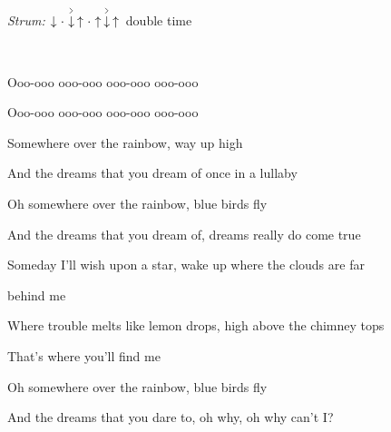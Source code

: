 \begin{song}


\begin{headerbox}
\RaiseBoxWithAccents
{} \quad
\textit{Strum:} $\Down\Miss\AccentDown\Up\Miss\Up\AccentDown\Up$ double time
\end{headerbox}

\begin{hchordbox}
\end{hchordbox}

\large

\bigskip

  \textbar\   \textbar\ 
  \textbar\   \textbar\  \par
{}Ooo-ooo \ch{Em}ooo-ooo ooo-ooo  \ch{C}ooo-ooo \par
\ch{F}Ooo-ooo ooo-ooo ooo-ooo ooo-ooo \par

\bigskip
 
Somewhere over the rainbow,  way up high \par
\ch{F}And the dreams that you dream of \ch{G}once in a lullaby  \par
Oh somewhere \ch{Em}over the rainbow, \ch{F}blue birds \ch{C}fly \par
\ch{F}And the \ch{C}dreams that you dream of, \ch{G}dreams really do come true  \par

\bigskip

Someday I'll wish upon a star, wake up where the clouds are far \par
behind me \par
Where trouble melts like lemon drops, high above the chimney tops \par
That's \ch{Am}where you'll find me \par

\bigskip

Oh somewhere over the rainbow, blue birds fly \par
\ch{F}And the \ch{C}dreams that you dare to, oh \ch{G}why, oh why can't I?  \par


\end{song}
